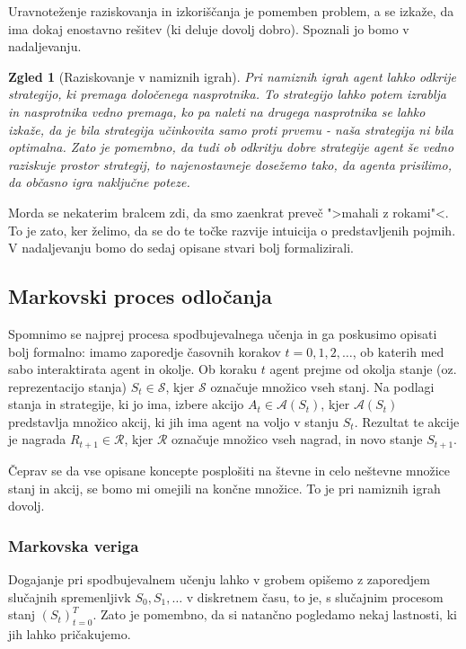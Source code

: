 \documentclass[12pt,a4paper]{amsart}
\theoremstyle{definition} %
\theoremstyle{plain} %
\newtheorem{zgled}[definicija]{Zgled}
\begin{document}
Uravnoteženje raziskovanja in izkoriščanja je pomemben problem, a se izkaže, da ima dokaj enostavno
rešitev (ki deluje dovolj dobro). Spoznali jo bomo v nadaljevanju.

\begin{zgled}[Raziskovanje v namiznih igrah]
    Pri namiznih igrah agent lahko odkrije strategijo, ki premaga določenega nasprotnika. To strategijo
    lahko potem izrablja in nasprotnika vedno premaga, ko pa naleti na drugega nasprotnika se lahko izkaže, 
    da je bila strategija učinkovita samo proti prvemu - naša strategija ni bila optimalna. Zato je 
    pomembno, da tudi ob odkritju dobre strategije agent še vedno raziskuje prostor strategij, to 
    najenostavneje dosežemo tako, da agenta prisilimo, da občasno igra naključne poteze.
\end{zgled}

Morda se nekaterim bralcem zdi, da smo zaenkrat preveč ">mahali z rokami"<. To je zato, ker želimo, 
da se do te točke razvije intuicija o predstavljenih pojmih. V nadaljevanju bomo do sedaj opisane 
stvari bolj formalizirali.


\subsection{Markovski proces odločanja}
Spomnimo se najprej procesa spodbujevalnega učenja in ga poskusimo opisati bolj formalno: 
imamo zaporedje časovnih korakov $t = 0, 1, 2, \dots$, ob katerih med sabo interaktirata agent 
in okolje. Ob koraku $t$ agent prejme od okolja stanje (oz. reprezentacijo stanja) $S_t \in 
\mathcal{S}$, kjer $\mathcal{S}$ označuje množico vseh stanj. Na podlagi stanja in strategije, 
ki jo ima, izbere akcijo $A_t \in \mathcal{A}(S_t)$, kjer $\mathcal{A}(S_t)$ predstavlja 
množico akcij, ki jih ima agent na voljo v stanju $S_t$. Rezultat te akcije je nagrada $R_{t+1} 
\in \mathcal{R}$, kjer $\mathcal{R}$ označuje množico vseh nagrad, in novo stanje $S_{t+1}$.

Čeprav se da vse opisane koncepte posplošiti na števne in celo neštevne množice stanj in akcij, 
se bomo mi omejili na končne množice. To je pri namiznih igrah dovolj.

\subsubsection{Markovska veriga}
Dogajanje pri spodbujevalnem učenju lahko v grobem opišemo z zaporedjem slučajnih spremenljivk $S_0,
S_1, \dots$ v diskretnem času, to je, s slučajnim procesom stanj $(S_t)_{t=0}^T$. Zato je pomembno, 
da si natančno pogledamo nekaj lastnosti, ki jih lahko pričakujemo. 
\end{document}
